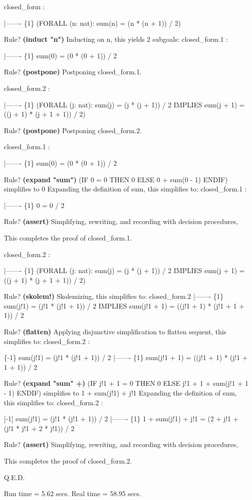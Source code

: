      closed_form :  
     
       |-------
     \{1\}   (FORALL (n: nat): sum(n) = (n * (n + 1)) / 2)
     
     Rule? {\bf (induct "n")}
     Inducting on n,
     this yields  2 subgoals: 
     closed_form.1 :  
     
       |-------
     \{1\}   sum(0) = (0 * (0 + 1)) / 2
     
     Rule? {\bf (postpone)}
     Postponing closed_form.1.
     
     closed_form.2 :  
     
       |-------
     \{1\}   (FORALL (j: nat):
              sum(j) = (j * (j + 1)) / 2
                IMPLIES sum(j + 1) = ((j + 1) * (j + 1 + 1)) / 2)
     
     Rule? {\bf (postpone)}
     Postponing closed_form.2.
     
     closed_form.1 :  
     
       |-------
     \{1\}   sum(0) = (0 * (0 + 1)) / 2
     
     Rule? {\bf (expand "sum")}
     (IF 0 = 0 THEN 0 ELSE 0 + sum(0 - 1) ENDIF) 
     simplifies to 0
     Expanding the definition of sum,
     this simplifies to: 
     closed_form.1 :  
     
       |-------
     \{1\}   0 = 0 / 2
     
     Rule? {\bf (assert)}
     Simplifying, rewriting, and recording with decision procedures,
     
     This completes the proof of closed_form.1.
     
     closed_form.2 :  
     
       |-------
     \{1\}   (FORALL (j: nat):
              sum(j) = (j * (j + 1)) / 2
                IMPLIES sum(j + 1) = ((j + 1) * (j + 1 + 1)) / 2)
     
     Rule? {\bf (skolem!)}
     Skolemizing,
     this simplifies to: 
     closed_form.2  |-------
     \{1\}   sum(j!1) = (j!1 * (j!1 + 1)) / 2
             IMPLIES sum(j!1 + 1) = ((j!1 + 1) * (j!1 + 1 + 1)) / 2
     
     Rule? {\bf (flatten)}
     Applying disjunctive simplification to flatten sequent,
     this simplifies to: 
     closed_form.2 :  
     
     \{-1\}   sum(j!1) = (j!1 * (j!1 + 1)) / 2
       |-------
     \{1\}   sum(j!1 + 1) = ((j!1 + 1) * (j!1 + 1 + 1)) / 2
     
     Rule? {\bf (expand "sum" +)}
     (IF j!1 + 1 = 0 THEN 0 ELSE j!1 + 1 + sum(j!1 + 1 - 1) ENDIF) 
     simplifies to 1 + sum(j!1) + j!1
     Expanding the definition of sum,
     this simplifies to: 
     closed_form.2 :  
     
     [-1]   sum(j!1) = (j!1 * (j!1 + 1)) / 2
       |-------
     \{1\}   1 + sum(j!1) + j!1 = (2 + j!1 + (j!1 * j!1 + 2 * j!1)) / 2
     
     Rule? {\bf (assert)}
     Simplifying, rewriting, and recording with decision procedures,
     
     This completes the proof of closed_form.2.
     
     Q.E.D.
     
     
     Run time  = 5.62 secs.
     Real time = 58.95 secs.

